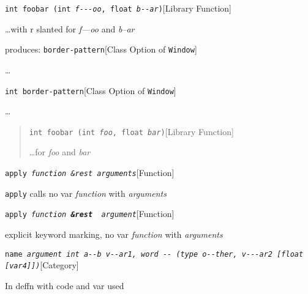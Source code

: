 \documentclass{book}
\begin{document}
\noindent\texttt{int foobar (int \textnormal{\textsl{f{-}{-}{-}oo}}, float \textnormal{\textsl{b{-}{-}ar}})}\hfill[Library Function]



%
\dots{}\@ with r slanted for \textsl{f---oo} and \textsl{b--ar}

\noindent{}produces:
\noindent\texttt{border-pattern}\hfill[Class Option of \texttt{Window}]



%
\dots{}\@

\noindent\texttt{\texttt{int} border-pattern}\hfill[Class Option of \texttt{Window}]



%
\dots{}\@

\begin{quote}
\noindent\texttt{int foobar (int \textsl{foo}, float \textsl{bar})}\hfill[Library Function]



%
\dots{}\@ for \textsl{foo} and \textsl{bar}
\end{quote}

\noindent\texttt{apply \EmbracOn{}\textsl{function \&rest arguments}}\hfill[Function]



%
\texttt{apply} calls no var \textsl{function} with \textsl{arguments}

\noindent\texttt{apply \EmbracOn{}\textsl{function \EmbracOff{}\textnormal{\textbf{\&rest }}\EmbracOn{} argument}}\hfill[Function]



%
explicit keyword marking, no var \textsl{function} with \textsl{arguments}

\noindent\texttt{name \EmbracOn{}\textsl{argument \EmbracOff{}\texttt{int}\EmbracOn{} \EmbracOff{}\texttt{a{-}{-}b}\EmbracOn{} \EmbracOff{}\textsl{v{-}{-}ar1}\EmbracOn{}, word \EmbracOff{}\texttt{{-}{-}}\EmbracOn{} (\EmbracOff{}\texttt{type o{-}{-}ther}\EmbracOn{}, \EmbracOff{}\textsl{v{-}{-}{-}ar2}\EmbracOn{}  [\EmbracOff{}\texttt{float}\EmbracOn{} [\EmbracOff{}\textsl{var4}\EmbracOn{}]])}}\hfill[Category]



%
In deffn with code and var used
\end{document}
